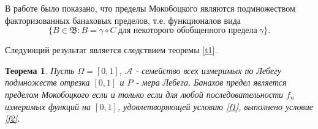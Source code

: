 \documentclass[12pt]{article}
\newtheorem{thm}{Теорема}
\def\B{{\mathfrak{B}}}
\begin{document}
 В работе \cite{Bjorklund} было показано, что пределы Мокобоцкого являются подмножеством факторизованных банаховых пределов, т.е. функционалов вида
$$\{ B\in \B : B=\gamma \circ C \ \text{для некоторого обобщенного предела} \ \gamma\}.$$

Следующий результат является следствием теоремы \ref{t1}.

\begin{thm}
Пусть $\Omega=[0,1]$, $\mathcal A$ - семейство всех измеримых по Лебегу подмножеств отрезка $[0,1]$ и $P$ - мера Лебега. Банахов предел является пределом Мокобоцкого если и только если для любой последовательности $f_n$  измеримых функций на $[0,1]$,  удовлетворяющей условию \eqref{f1}, выполнено условие \eqref{f2}.
\end{thm}



%
\end{document}
